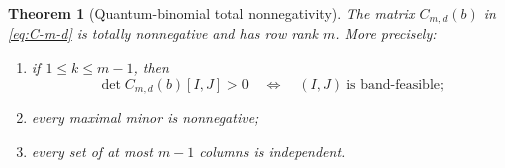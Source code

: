 \documentclass[11pt]{amsart}
\newtheorem{theorem}{Theorem}[section]
\theoremstyle{definition}
\theoremstyle{remark}
\begin{document}
\begin{theorem}[Quantum-binomial total nonnegativity]\label{thm:qbin-TN}
The matrix $C_{m,d}(b)$ in \eqref{eq:C-m-d} is totally nonnegative and has row rank $m$.  More precisely:
\begin{enumerate}
\item if $1\le k\le m-1$, then
\begin{equation}\label{eq:strict-lower-band}
 \det C_{m,d}(b)[I,J]>0
 \quad\Longleftrightarrow\quad
 (I,J)\ \text{is band-feasible};
\end{equation}
\item every maximal minor is nonnegative;
\item every set of at most $m-1$ columns is independent.
\end{enumerate}
\end{theorem}
\end{document}
